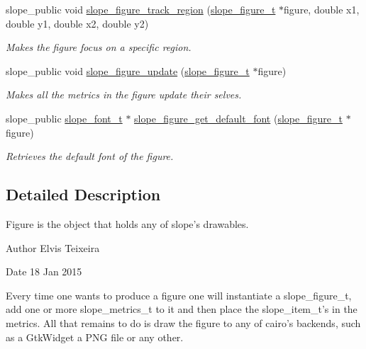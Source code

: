 \begin{DoxyCompactItemize}
slope\+\_\+public void \hyperlink{group__Figure_gad5502c2dd6a1897b23659431f0dedd91}{slope\+\_\+figure\+\_\+track\+\_\+region} (\hyperlink{group__Figure_ga507cc82eeca8255d6c0f603ffdaeb59e}{slope\+\_\+figure\+\_\+t} $\ast$figure, double x1, double y1, double x2, double y2)
\begin{DoxyCompactList}\small\item\em Makes the figure focus on a specific region. \end{DoxyCompactList}\item 
slope\+\_\+public void \hyperlink{group__Figure_ga9a4978e9b4cb7cb7f27f6efb8fb06d9b}{slope\+\_\+figure\+\_\+update} (\hyperlink{group__Figure_ga507cc82eeca8255d6c0f603ffdaeb59e}{slope\+\_\+figure\+\_\+t} $\ast$figure)
\begin{DoxyCompactList}\small\item\em Makes all the metrics in the figure update their selves. \end{DoxyCompactList}\item 
slope\+\_\+public \hyperlink{group__Primitives_ga29945f78eef5fcab497a3d15908b4b73}{slope\+\_\+font\+\_\+t} $\ast$ \hyperlink{group__Figure_gae21bced2fcd97f81adf349514a5682b3}{slope\+\_\+figure\+\_\+get\+\_\+default\+\_\+font} (\hyperlink{group__Figure_ga507cc82eeca8255d6c0f603ffdaeb59e}{slope\+\_\+figure\+\_\+t} $\ast$figure)
\begin{DoxyCompactList}\small\item\em Retrieves the default font of the figure. \end{DoxyCompactList}\end{DoxyCompactItemize}


\subsection{Detailed Description}
Figure is the object that holds any of slope's drawables. 

\begin{DoxyAuthor}{Author}
Elvis Teixeira 
\end{DoxyAuthor}
\begin{DoxyDate}{Date}
18 Jan 2015
\end{DoxyDate}
Every time one wants to produce a figure one will instantiate a slope\+\_\+figure\+\_\+t, add one or more slope\+\_\+metrics\+\_\+t to it and then place the slope\+\_\+item\+\_\+t's in the metrics. All that remains to do is draw the figure to any of cairo's backends, such as a Gtk\+Widget a P\+N\+G file or any other. 

